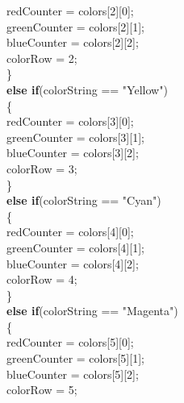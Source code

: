 \documentclass[12pt]{article}
\begin{document}
\begin{flushleft}
{\qquad \qquad \qquad \qquad \qquad \qquad	redCounter = colors[2][0];\\ 
\qquad \qquad \qquad \qquad \qquad \qquad	greenCounter = colors[2][1];\\
\qquad \qquad \qquad \qquad \qquad \qquad	blueCounter = colors[2][2];\\ 
\qquad \qquad \qquad \qquad \qquad \qquad		colorRow = 2;\\               
\qquad \qquad \qquad \qquad \qquad				\}\\
\qquad \qquad \qquad \qquad \qquad				\textbf{else if}(colorString == "Yellow")\\
\qquad \qquad \qquad \qquad \qquad				\{\\
\qquad \qquad \qquad \qquad \qquad \qquad		redCounter = colors[3][0];\\ 
\qquad \qquad \qquad \qquad \qquad \qquad	greenCounter = colors[3][1];\\
\qquad \qquad \qquad \qquad \qquad \qquad	blueCounter = colors[3][2];\\
\qquad \qquad \qquad \qquad \qquad \qquad		colorRow = 3;\\
\qquad \qquad \qquad \qquad \qquad				\}\\
\qquad \qquad \qquad \qquad \qquad				\textbf{else if}(colorString == "Cyan")\\
\qquad \qquad \qquad \qquad \qquad				\{\\
\qquad \qquad \qquad \qquad \qquad \qquad		redCounter = colors[4][0];\\ 
\qquad \qquad \qquad \qquad \qquad \qquad	greenCounter = colors[4][1];\\
\qquad \qquad \qquad \qquad \qquad \qquad	blueCounter = colors[4][2];\\
\qquad \qquad \qquad \qquad \qquad \qquad	colorRow = 4;\\
\qquad \qquad \qquad \qquad \qquad				\}\\
\qquad \qquad \qquad \qquad \qquad				\textbf{else if}(colorString == "Magenta")\\
\qquad \qquad \qquad \qquad \qquad				\{\\
\qquad \qquad \qquad \qquad \qquad \qquad	redCounter = colors[5][0];\\ 
\qquad \qquad \qquad \qquad \qquad \qquad		greenCounter = colors[5][1];\\
\qquad \qquad \qquad \qquad \qquad \qquad	blueCounter = colors[5][2];\\
\qquad \qquad \qquad \qquad \qquad \qquad		colorRow = 5;\\
}
\end{flushleft}
\end{document}
